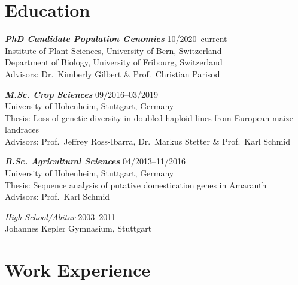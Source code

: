 \documentclass[margin,a4paper]{res}
\begin{document}
\begin{resume}

\section{Education}

\textbf{\textit{PhD Candidate Population Genomics}} \hfill 10/2020--current \\
Institute of Plant Sciences, University of Bern, Switzerland \\
Department of Biology, University of Fribourg, Switzerland \\
Advisors: Dr.~Kimberly Gilbert \& Prof.~Christian Parisod


\textbf{\textit{M.Sc. Crop Sciences}} \hfill 09/2016--03/2019 \\
University of Hohenheim, Stuttgart, Germany \\
Thesis: Loss of genetic diversity in doubled-haploid lines from European maize landraces\\
Advisors: Prof.~Jeffrey Ross-Ibarra, Dr.~Markus Stetter \& Prof.~Karl Schmid


\textbf{\textit{B.Sc. Agricultural Sciences}} \hfill 04/2013--11/2016 \\
University of Hohenheim, Stuttgart, Germany\\
Thesis: Sequence analysis of putative domestication genes in Amaranth\\
Advisors: Prof.~Karl Schmid

{\sl High School/Abitur} \hfill 2003--2011 \\
Johannes Kepler Gymnasium, Stuttgart

 
\section{Work Experience}


\end{resume}
\end{document}
